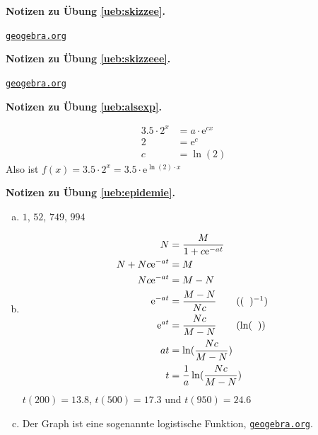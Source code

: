 \documentclass[%
11pt,%
twoside,%
titlepage,%
swissgerman,%
headsepline%
]{scrartcl}
\newcommand{\faReturnGray}{\textcolor{gray}{\faMailReply}} %
\newcommand{\geogebralink}{\href{https://www.geogebra.org/calculator}{\texttt{geogebra.org}}}
\theoremstyle{definition}
\theoremstyle{plain}
\newcommand{\concatueb}[1]{ueb:#1}%
\newcommand{\concatlsg}[1]{lsg:#1}%
\newenvironment{lsg}[1]{%
    \par\noindent\textbf{Notizen zu Übung \ref{\concatueb{#1}}.}%
    \label{\concatlsg{#1}} %
    \hfill\hyperref[\concatueb{#1}]{\faReturnGray}\par %
}{%
    \par%
}
\begin{document}
\begin{lsg}{skizzee}
    \geogebralink
\end{lsg}
\begin{lsg}{skizzeee}
    \geogebralink
\end{lsg}
\begin{lsg}{alsexp}
    \begin{align*}
        3.5\cdot2^x &= a\cdot \mathrm{e}^{cx}\tag{$a=3.5$}\\
        2 &= \mathrm{e}^{c}\\
        c &= \ln(2)
    \end{align*}
    Also ist $f(x)=3.5\cdot2^x=3.5\cdot \mathrm{e}^{\ln(2)\cdot x}$
\end{lsg}
\begin{lsg}{epidemie}
    \begin{enumerate}[a)]
        \item $1$, $52$, $749$, $994$
        \item \begin{align*}
            N &= \frac{M}{1+c\mathrm{e}^{-at}}\\
            N + Nc\mathrm{e}^{-at} &= M\\
            Nc\mathrm{e}^{-at} &= M-N\\
            \mathrm{e}^{-at} &= \frac{M-N}{Nc}\tag{$(\phantom{x})^{-1}$}\\
            \mathrm{e}^{at} &= \frac{Nc}{M-N} \tag{$\ln(\phantom{x})$}\\
            at &= \ln(\frac{Nc}{M-N})\\
            t &= \frac{1}{a}\ln(\frac{Nc}{M-N})
        \end{align*}
        $t(200)=13.8$, $t(500)=17.3$ und $t(950)=24.6$
        \item Der Graph ist eine sogenannte logistische Funktion, \geogebralink.
    \end{enumerate}
\end{lsg}

\cleardoublepage

\appendix
\end{document}
